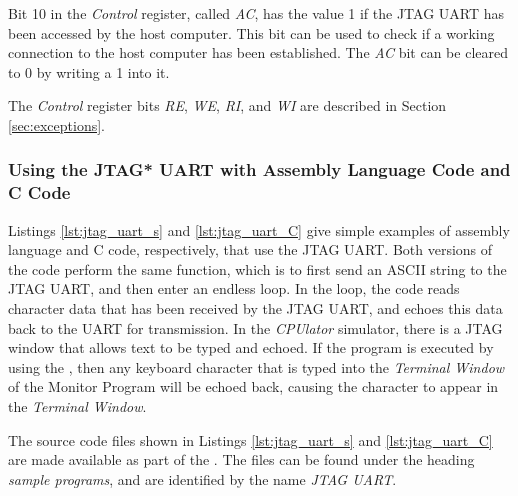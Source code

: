 Bit 10 in the {\it Control} register, called {\it AC}, has the value 1 if the JTAG UART has been
accessed by the host computer. This bit can be used to check if a working connection to
the host computer has been established. The {\it AC} bit can be cleared to 0 by writing a 1
into it.

The {\it Control} register bits {\it RE}, {\it WE}, {\it RI}, and {\it WI} are described 
in Section \ref{sec:exceptions}.

\subsubsection{Using the JTAG* UART with Assembly Language Code and C Code}

Listings \ref{lst:jtag_uart_s} and \ref{lst:jtag_uart_C} give simple examples of 
assembly language and C code, respectively, that use the JTAG UART. Both versions of the
code perform the same function, which is to first send an ASCII string to the JTAG UART,
and then enter an endless loop. In the loop, the code reads character data that has 
been received by the JTAG UART, and echoes this data back to the UART for transmission. In
the {\it CPUlator} simulator, there is a JTAG window that allows text to be typed and
echoed. If the program is executed by using the \productNameMed{}, then any keyboard character that 
is typed into the {\it Terminal Window} of the Monitor Program will be 
echoed back, causing the character to appear in the {\it Terminal Window}.

The source code files shown in Listings \ref{lst:jtag_uart_s} and \ref{lst:jtag_uart_C}
are made available as part of the  
\productNameMed{}. The files can be found under the heading {\it sample programs}, 
and are identified by the name {\it JTAG UART}.


